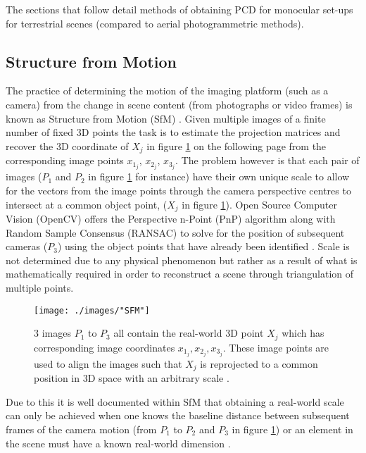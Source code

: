 The sections that follow detail methods of obtaining PCD for monocular set-ups for terrestrial scenes (compared to aerial photogrammetric methods). 

\subsection{Structure from Motion}
The practice of determining the motion of the imaging platform (such as a camera) from the change in scene content (from photographs or video frames) is known as Structure from Motion (SfM) \citep{scaramuzza_absolute_2009}. Given multiple images of a finite number of fixed 3D points the task is to estimate the projection matrices and recover the 3D coordinate of $X_j$ in figure \ref{sfm} on the following page from the corresponding image points $x_{1_{j}}$, $x_{2_{j}}$, $x_{3_{j}}$. The problem however is that each pair of images (\textbf{$P_1$} and \textbf{$P_2$} in figure \ref{sfm} for instance) have their own unique scale to allow for the vectors from the image points through the camera perspective centres to intersect at a common object point, ($X_j$ in figure \ref{sfm}). Open Source Computer Vision (OpenCV) offers the Perspective n-Point (PnP) algorithm along with Random Sample Consensus (RANSAC) to solve for the position of subsequent cameras ($P_3$) using the object points that have already been identified \citep{mccann_3d_2015}. Scale is not determined due to any physical phenomenon but rather as a result of what is mathematically required in order to reconstruct a scene through triangulation of multiple points.

\begin{figure}[ht!]
	\centering
	\texttt{[image: ./images/"SFM"]}
	\caption[SfM with 3 images]{$3$ images $P_1$ to $P_3$ all contain the real-world 3D point $X_j$ which has corresponding image coordinates $x_{1_j}, x_{2_j}, x_{3_j}$. These image points are used to align the images such that $X_j$ is reprojected to a common position in 3D space with an arbitrary scale \citep{fergus_lecture_2012}.
		\label{sfm}}
\end{figure}

Due to this it is well documented within SfM that obtaining a real-world scale can only be achieved when one knows the baseline distance between subsequent frames of the camera motion (from \textbf{$P_1$} to  \textbf{$P_2$} and \textbf{$P_3$} in figure \ref{sfm}) or an element in the scene must have a known real-world dimension \citep{fergus_lecture_2012}. 

